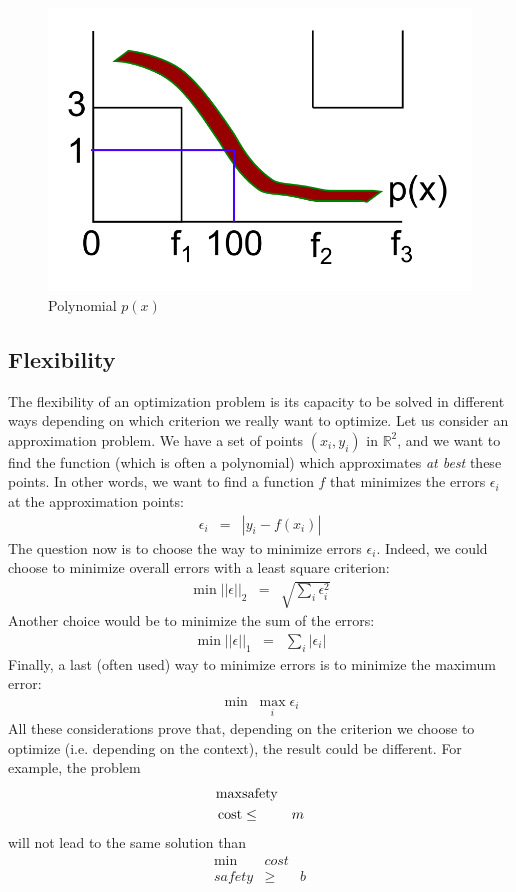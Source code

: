 \begin{figure}[ht!]
\centering
\includegraphics[scale=0.4]{./images/Course3_poly.png}
\caption{Polynomial $p(x)$}
\label{poly}
\end{figure}

\subsection{Flexibility}
The flexibility of an optimization problem is its capacity to be solved in different ways depending on which criterion we really want to optimize. Let us consider an approximation problem. We have a set of points $(x_i,y_i)$ in $\mathbb{R}^2$, and we want to find the function (which is often a polynomial) which approximates \textit{at best} these points. In other words, we want to find a function $f$ that minimizes the errors $\epsilon _i$ at the approximation points:
\begin{eqnarray*}
\epsilon_i &=& |y_i - f(x_i)|
\end{eqnarray*}
The question now is to choose the way to minimize errors $\epsilon _i$. Indeed, we could choose to minimize overall errors with a least square criterion: 
\begin{eqnarray*}
\min ||\epsilon||_2 &=& \sqrt{\sum_i{\epsilon_i^2}}
\end{eqnarray*}
Another choice would be to minimize the sum of the errors:
\begin{eqnarray*}
\min ||\epsilon||_1 &=& \sum_i{|\epsilon_i|}
\end{eqnarray*}
Finally, a last (often used) way to minimize errors is to minimize the maximum error: 
\begin{eqnarray*}
\min\;\max_i \epsilon_i
\end{eqnarray*}
All these considerations prove that, depending on the criterion we choose to optimize (i.e. depending on the context), the result could be different. For example, the problem
\begin{eqnarray*}
\max &\textnormal{safety}&\\
\textnormal{cost} &\le& m
\end{eqnarray*}
will not lead to the same solution than
\begin{eqnarray*}
\min &cost&\\
safety &\ge& b
\end{eqnarray*}

